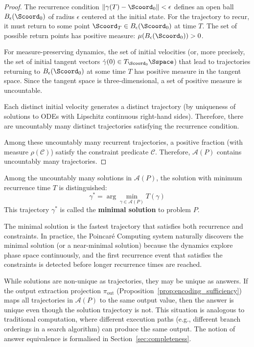 \begin{proof}
The recurrence condition $\|\gamma(T) - \Scoord_0\| < \epsilon$ defines an open ball $B_\epsilon(\Scoord_0)$ of radius $\epsilon$ centered at the initial state. For the trajectory to recur, it must return to some point $\Scoord_T \in B_\epsilon(\Scoord_0)$ at time $T$. The set of possible return points has positive measure: $\mu(B_\epsilon(\Scoord_0)) > 0$.

For measure-preserving dynamics, the set of initial velocities (or, more precisely, the set of initial tangent vectors $\dot{\gamma}(0) \in T_{\Scoord_0}\Sspace$) that lead to trajectories returning to $B_\epsilon(\Scoord_0)$ at some time $T$ has positive measure in the tangent space. Since the tangent space is three-dimensional, a set of positive measure is uncountable.

Each distinct initial velocity generates a distinct trajectory (by uniqueness of solutions to ODEs with Lipschitz continuous right-hand sides). Therefore, there are uncountably many distinct trajectories satisfying the recurrence condition.

Among these uncountably many recurrent trajectories, a positive fraction (with measure $\rho(\mathcal{C})$) satisfy the constraint predicate $\mathcal{C}$. Therefore, $\mathcal{A}(P)$ contains uncountably many trajectories.
\end{proof}

\begin{corollary}
\label{cor:solution_selection}
Among the uncountably many solutions in $\mathcal{A}(P)$, the solution with minimum recurrence time $T$ is distinguished:
\begin{equation}
\gamma^* = \arg\min_{\gamma \in \mathcal{A}(P)} T(\gamma)
\label{eq:minimal_solution}
\end{equation}
This trajectory $\gamma^*$ is called the \textbf{minimal solution} to problem $P$.
\end{corollary}

The minimal solution is the fastest trajectory that satisfies both recurrence and constraints. In practice, the Poincaré Computing system naturally discovers the minimal solution (or a near-minimal solution) because the dynamics explore phase space continuously, and the first recurrence event that satisfies the constraints is detected before longer recurrence times are reached.

\begin{remark}
\label{rem:answer_equivalence}
While solutions are non-unique as trajectories, they may be unique as answers. If the output extraction projection $\pi_{\text{out}}$ (Proposition~\ref{prop:encoding_sufficiency}) maps all trajectories in $\mathcal{A}(P)$ to the same output value, then the answer is unique even though the solution trajectory is not. This situation is analogous to traditional computation, where different execution paths (e.g., different branch orderings in a search algorithm) can produce the same output. The notion of answer equivalence is formalised in Section~\ref{sec:completeness}.
\end{remark}


